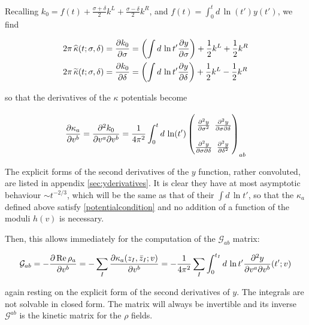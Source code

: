 Recalling $k_0 = f(t) + \frac{\sigma+\delta}{2} k^L + \frac{\sigma-\delta}{2} k^R$, and $f(t) = \int_0^t d \, \ln(t') y(t')$, we find

\begin{align}
 	2\pi \, \widehat{\kappa}(t;\sigma,\delta) =	\frac{\partial k_0}{\partial\sigma} & = \left( \int d\, \ln t' \frac{\partial y}{\partial\sigma} \right) + \frac{1}2 k^L + \frac{1}2 k^R \\
	2\pi \, \widetilde{\kappa}(t;\sigma,\delta) =  \frac{\partial k_0}{\partial\delta} & = \left( \int d\, \ln t' \frac{\partial y}{\partial\delta} \right) + \frac{1}2 k^L - \frac{1}2 k^R
	\label{}
\end{align}


so that the derivatives of the $\kappa$ potentials become

\begin{equation}
\arraycolsep=1.4pt\def\arraystretch{2.2}
\pder{\kappa_a}{v^b} = \frac{\partial^2 k_0}{\partial v^a \partial v^b} = \frac{1}{4 \pi^2} \int_0^t d\, \ln(t')
	\begin{pmatrix}
		\frac{\partial^2 y}{\partial \sigma^2} & \frac{\partial^2 y}{\partial \sigma \partial \delta} \\
		\frac{\partial^2 y}{\partial \sigma\partial \delta} & \frac{\partial^2 y}{\partial \delta^2}
	\end{pmatrix}_{ab}
	\label{}
\end{equation}

The explicit forms of the second derivatives of the $y$ function, rather convoluted, are listed in appendix \ref{sec:yderivatives}. It is clear they have at most asymptotic behaviour $\sim t^{-2/3}$, which will be the same as that of their $\int d\,\ln t'$, so that the $\kappa_a$ defined above satisfy \eqref{potentialcondition} and no addition of a function of the moduli $h(v)$ is necessary.

Then, this allows immediately for the computation of the $\mathcal{G}_{ab}$ matrix:

\begin{equation}
	\mathcal{G}_{ab} = - \frac{\partial\operatorname{Re} \rho_a}{\partial v^b}  = - \sum_I \frac{\partial \kappa_a(z_I,\bar z_I; v)}{\partial v^b} = - \frac{1}{4\pi^2} \sum_I \int_0^{t_I} d\,\ln t' \frac{\partial^2 y}{\partial v^a \partial v^b} (t' ; v)
	\label{Gfinal}
\end{equation}

again resting on the explicit form of the second derivatives of $y$. The integrals are not solvable in closed form. The matrix will always be invertible and its inverse $\mathcal{G}^{ab}$ is the kinetic matrix for the $\rho$ fields.

